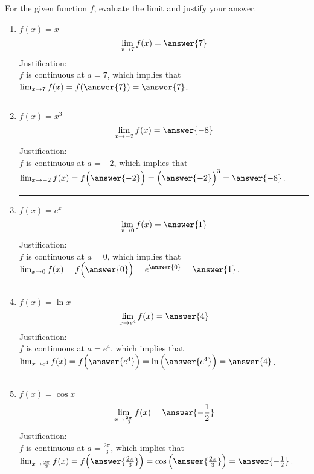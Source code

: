 \documentclass{ximera}
\author{Nela Lakos \and Bobby Ramsey}
\begin{document}
\begin{exercise}


For the given function $f$, evaluate the limit and justify your answer.\\


\begin{enumerate}
 \item $f(x)=x$
 \[
\lim_{x\to 7}f(x) = \answer{7}
\] 
Justification:\\ $f$ is continuous at $a=7$, which implies that
$\lim_{x\to 7}f(x)=f(\answer{7})=\answer{7}$.

\noindent\rule[0.5ex]{\linewidth}{.2pt}

\item  $f(x)=x^3$
 \[
\lim_{x\to -2}f(x) = \answer{-8}
\] 
Justification:\\ $f$ is continuous at $a=-2$, which implies that\\[1em]
$\lim_{x\to -2}f(x)=f\Bigl(\answer{ -2}
\Bigr)=\Bigl(\answer{-2 }\Bigr)^3=\answer{-8}$.

\noindent\rule[0.5ex]{\linewidth}{.2pt}

%

\item  $f(x)=e^{x}$
 \[
\lim_{x\to 0}f(x) = \answer{1}
\] 
Justification:\\ $f$ is continuous at $a=0$, which implies that\\[1em]
$\lim_{x\to 0}f(x)=f\Bigl(\answer{0}\Bigr)=e^{\answer{0}}=\answer{1}$.

\noindent\rule[0.5ex]{\linewidth}{.2pt}

\item  $f(x)=\ln{x}$
 \[
\lim_{x\to e^{4}}f(x) = \answer{4}
\] 
Justification:\\ $f$ is continuous at $a=e^{4}$, which implies that\\[1em]
$\lim_{x\to e^{4}}f(x)=f\Bigl(\answer{e^{4}}\Bigr)=\ln{\Bigl(\answer{e^{4}}\Bigr)}=\answer{4}$.

\noindent\rule[0.5ex]{\linewidth}{.2pt}

\item $f(x)=\cos{x}$
 \[
\lim_{x\to \frac{2\pi}{3}}f(x) = \answer{-\frac{1}{2}}
\] 
Justification:\\ $f$ is continuous at $a= \frac{2\pi}{3}$, which implies that\\[1em]
$\lim_{x\to \frac{2\pi}{3}}f(x)=f\Bigl(\answer{ \frac{2\pi}{3}}\Bigr)=\cos{\Bigl(\answer{ \frac{2\pi}{3}}\Bigr)}=\answer{-\frac{1}{2}}$.


\end{enumerate}
\end{exercise}
\end{document}
